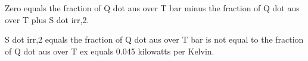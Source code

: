Zero equals the fraction of Q dot aus over T bar minus the fraction of Q dot aus over T plus S dot irr,2.

S dot irr,2 equals the fraction of Q dot aus over T bar is not equal to the fraction of Q dot aus over T ex equals 0.045 kilowatts per Kelvin.
